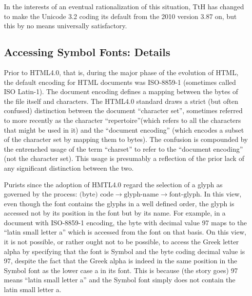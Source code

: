 \documentclass[12pt]{article}
\begin{document}
In the interests of an eventual rationalization of this situation, TtH
 has changed to make the Unicode 3.2 coding its default from the 2010
 version 3.87 on, but this by no means universally satisfactory.

\subsection{Accessing Symbol Fonts: Details}

Prior to HTML4.0, that is, during the major phase of the evolution of
HTML, the default encoding for HTML documents was ISO-8859-1
(sometimes called ISO Latin-1). The document encoding defines a
mapping between the bytes of the file itself and characters. The
HTML4.0 standard draws a strict (but often confused) distinction
between the document ``character set'', sometimes referred to more
recently as the character ``repertoire''(which refers to all the
characters that might be used in it) and the ``document encoding''
(which encodes a subset of the character set by mapping them to
bytes). The confusion is compounded by the entrenched usage of the term
``charset'' to refer to the ``document encoding'' (not the character
set). This usage is presumably a reflection of the prior lack of any
significant distinction between the two. 

Purists since the adoption of HMTL4.0 regard the selection of a glyph
as governed by the process: $\mbox{(byte) code} \rightarrow
\mbox{glyph-name} \rightarrow \mbox{font-glyph}$. In this view, even
though the font contains the glyphs in a well defined order, the
glyph is accessed not by its position in the font but by its name. For
example, in a document with ISO-8859-1 encoding, the byte with decimal
value 97 maps to the ``latin small letter a'' which is accessed from
the font on that basis.  On this view, it is not possible, or rather
ought not to be possible, to access the Greek letter alpha by
specifying that the font is Symbol and the byte coding decimal value
is 97, despite the fact that the Greek alpha is indeed in the same
position in the Symbol font as the lower case a in its font. This is
because (the story goes) 97 means ``latin small letter a'' and the
Symbol font simply does not contain the latin small letter a.
\end{document}
